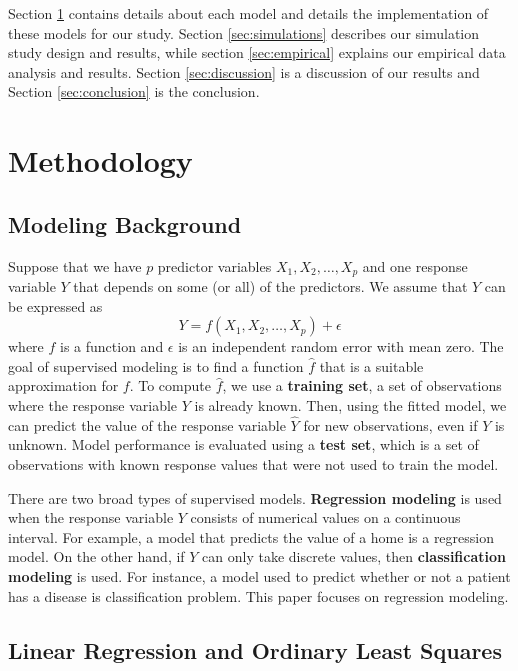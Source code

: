 \documentclass{article}
\begin{document}
	Section \ref{sec:methodology} contains details about each model and details the implementation of these models for our study. Section \ref{sec:simulations} describes our simulation study design and results, while section \ref{sec:empirical} explains our empirical data analysis and results. Section \ref{sec:discussion} is a discussion of our results and Section \ref{sec:conclusion} is the conclusion.
	
	\newpage
	\section{Methodology}\label{sec:methodology}
	\subsection{Modeling Background}
	
	Suppose that we have $p$ predictor variables $X_1, X_2, \dotsc, X_p$ and one response variable $Y$ that depends on some (or all) of the predictors. We assume that $Y$ can be expressed as
	\begin{equation}\label{eqn:relationship}
		Y = f(X_1, X_2, \dotsc, X_p) + \epsilon
	\end{equation}
	where $f$ is a function and $\epsilon$ is an independent random error with mean zero. The goal of supervised modeling is to find a function $\hat{f}$ that is a suitable approximation for $f$. To compute $\hat{f}$, we use a \textbf{training set}, a set of observations where the response variable $Y$ is already known. Then, using the fitted model, we can predict the value of the response variable $\hat{Y}$ for new observations, even if $Y$ is unknown. Model performance is evaluated using a \textbf{test set}, which is a set of observations with known response values that were not used to train the model.
	
	There are two broad types of supervised models. \textbf{Regression modeling} is used when the response variable $Y$ consists of numerical values on a continuous interval. For example, a model that predicts the value of a home is a regression model. On the other hand, if $Y$ can only take discrete values, then \textbf{classification modeling} is used. For instance, a model used to predict whether or not a patient has a disease is classification problem. This paper focuses on regression modeling.
	
	\subsection{Linear Regression and Ordinary Least Squares}
	
\end{document}
